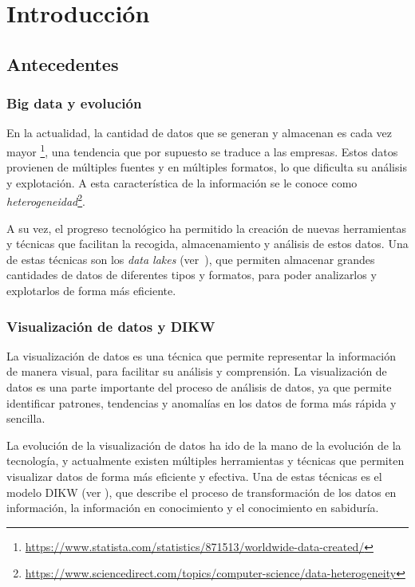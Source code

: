 \chapter{Introducción}\label{chap:intro}
\section{Antecedentes}\label{sec:antecedentes}
\subsection{Big data y evolución}\label{subsec:bigdata}
En la actualidad, la cantidad de datos que se generan y almacenan es cada vez mayor
\footnote{\url{https://www.statista.com/statistics/871513/worldwide-data-created/}}, una tendencia
que por supuesto se traduce a las empresas. Estos datos provienen de múltiples fuentes y en múltiples
formatos, lo que dificulta su análisis y explotación. A esta característica de la información se le
conoce como \textit{heterogeneidad}\footnote{\url{https://www.sciencedirect.com/topics/computer-science/data-heterogeneity}}.

A su vez, el progreso tecnológico ha permitido la creación de nuevas herramientas y técnicas
que facilitan la recogida, almacenamiento y análisis de estos datos. Una de estas técnicas son
los \textit{data lakes} (ver~),
que permiten almacenar grandes cantidades de datos de diferentes tipos y formatos, para poder
analizarlos y explotarlos de forma más eficiente.

\subsection{Visualización de datos y DIKW}\label{subsec:visual}
La visualización de datos es una técnica que permite representar la información de manera visual,
para facilitar su análisis y comprensión. La visualización de datos es una parte importante del
proceso de análisis de datos, ya que permite identificar patrones, tendencias y anomalías en los
datos de forma más rápida y sencilla.

La evolución de la visualización de datos ha ido de la mano de la evolución de la tecnología, y
actualmente existen múltiples herramientas y técnicas que permiten visualizar datos de forma
más eficiente y efectiva. Una de estas técnicas es el modelo DIKW (ver ),
que describe el proceso de transformación de los datos en información, la información en
conocimiento y el conocimiento en sabiduría.


